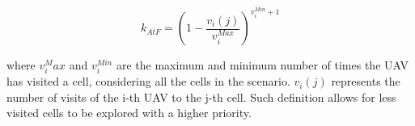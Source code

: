 \begin{equation}
	k_{AtF} = \left( 1 - \frac{v_i(j)}{v_i^{Max}} \right) ^ {v_i^{Min} + 1}
\end{equation}

where $v_i^Max$ and $v_i^{Min}$ are the maximum and minimum number of times the \gls{UAV} has visited a cell, considering all the cells in the scenario. $v_i(j)$ represents the number of visits of the i-th \gls{UAV} to the j-th cell. Such definition allows for less visited cells to be explored with a higher priority.

